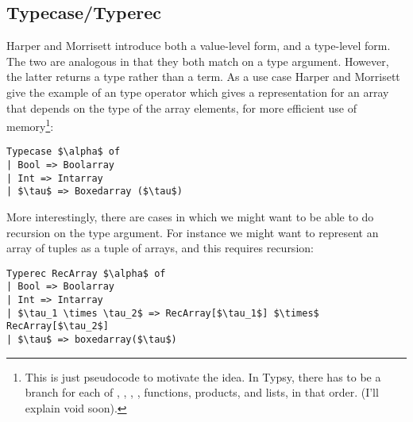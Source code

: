 \documentclass[pageno]{jpaper}
\begin{document}
{{{%
%

\subsection{Typecase/Typerec}

Harper and Morrisett introduce both a value-level  form, and a type-level  form.
The two are analogous in that they both match on a type argument. However, the latter returns a type rather
than a term. As a use case Harper and Morrisett give the example of an type operator which
gives a representation for an array that depends on the type of the array elements, for more efficient use
of memory\footnote{This is just pseudocode to motivate the idea. In Typsy, there has to be a branch
for each of , , , , functions, products, and lists, in that order. (I'll explain
void soon).}:

\begin{lstlisting}[mathescape]
Typecase $\alpha$ of
| Bool => Boolarray
| Int => Intarray
| $\tau$ => Boxedarray ($\tau$)                    
\end{lstlisting}

More interestingly, there are cases in which we might want to be able to do recursion on the type argument.
For instance we might want to represent an array of tuples as a tuple of arrays, and this requires recursion:
\begin{lstlisting}[mathescape]
Typerec RecArray $\alpha$ of
| Bool => Boolarray
| Int => Intarray
| $\tau_1 \times \tau_2$ => RecArray[$\tau_1$] $\times$ RecArray[$\tau_2$]
| $\tau$ => boxedarray($\tau$)
\end{lstlisting}

}}}
\end{document}
